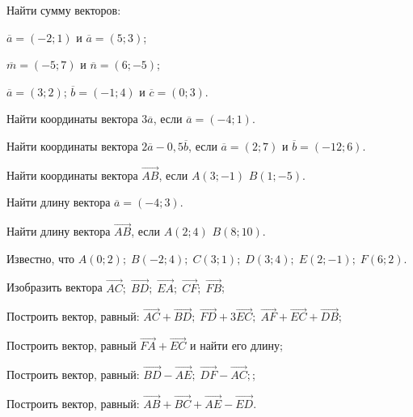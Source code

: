 %
%
\begin{consultation}
	\begin{listofex}
		\item Найти сумму векторов:
		\begin{enumcols}[itemcolumns=2]
			\item \( \overline{a}=(-2;1) \) и \( \overline{a}=(5;3) \);
			\item \( \overline{m}=(-5;7) \) и \( \overline{n}=(6;-5) \);
			\item \( \overline{a}=(3;2) \); \( \overline{b}=(-1;4) \) и \( \overline{c}=(0;3) \).
		\end{enumcols}
		\item Найти координаты вектора \( 3\overline{a} \), если \( \overline{a}=(-4;1) \).
		\item Найти координаты вектора \( 2\overline{a}-0,5\overline{b} \), если \( \overline{a}=(2;7) \) и \( \overline{b}=(-12;6) \).
		\item Найти координаты вектора \( \overrightarrow{AB} \), если \( A(3;-1) \) \( B(1;-5) \).
		\item Найти длину вектора \( \overline{a}=(-4;3) \).
		\item Найти длину вектора \( \overrightarrow{AB} \), если \( A(2;4) \) \( B(8;10) \).
		\item Известно, что \( A(0;2);\;B(-2;4);\;C(3;1);\;D(3;4);\;E(2;-1);\;F(6;2) \).
		\begin{enumcols}
			\item Изобразить вектора \( \overrightarrow{AC};\;\overrightarrow{BD};\; \overrightarrow{EA};\;\overrightarrow{CF};\;\overrightarrow{FB} \);
			\item Построить вектор, равный: \( \overrightarrow{AC}+\overrightarrow{BD};\;\overrightarrow{FD}+3\overrightarrow{EC};\;\overrightarrow{AF}+\overrightarrow{EC}+\overrightarrow{DB} \);
			\item Построить вектор, равный \( \overrightarrow{FA}+\overrightarrow{EC} \) и найти его длину;
			\item Построить вектор, равный: \( \overrightarrow{BD}-\overrightarrow{AE};\;\overrightarrow{DF}-\overrightarrow{AC}; \);
			\item Построить вектор, равный: \( \overrightarrow{AB}+\overrightarrow{BC}+\overrightarrow{AE}-\overrightarrow{ED} \).
		\end{enumcols}
	\end{listofex}
\end{consultation}
%
